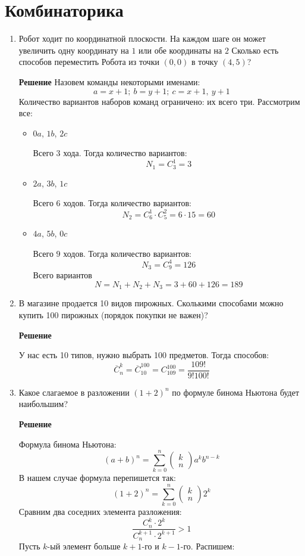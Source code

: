 \documentclass[12pt]{article}
\newcommand{\RomanNumeralCaps}[1]
{\MakeUppercase{\romannumeral #1}}
\begin{document}
	\section{Комбинаторика \RomanNumeralCaps{2}}
	\begin{enumerate}[label={\textbf{\arabic{section}.\arabic*}}]
		\item Робот ходит по координатной плоскости. На каждом шаге он может увеличить одну координату на $1$ или обе координаты на $2$ Сколько есть способов переместить Робота из точки $(0,0)$ в точку $(4,5)$?
		
		\textbf{Решение}
		Назовем команды некоторыми именами:
		$$
		a = x+1;~b = y+1;~c = x+1,~y+1
		$$
		Количество вариантов наборов команд ограничено: их всего три. Рассмотрим все:
		\begin{itemize}
			\item $0a$, $1b$, $2c$
			
			Всего $3$ хода. Тогда количество вариантов:
			$$
			N_1 = C_3^1 = 3
			$$
			\item $2a$, $3b$, $1c$
			
			Всего $6$ ходов. Тогда количество вариантов:
			$$
			N_2 = C_6^1\cdot C_5^2 = 6\cdot15 = 60
			$$
			\item $4a$, $5b$, $0c$
			
			Всего $9$ ходов. Тогда количество вариантов:
			$$
			N_3 = C_9^4 = 126
			$$
			Всего вариантов
			$$
			N = N_1 + N_2 + N_3 = 3 + 60 + 126 = 189
			$$
		\end{itemize}
		
		\item В магазине продается 10 видов пирожных. Сколькими способами можно купить 100 пирожных (порядок покупки не важен)?
		
		\textbf{Решение}
		
		У нас есть 10 типов, нужно выбрать 100 предметов. Тогда способов:
		$$
		\overline{C}_n^k = \overline{C}_{10}^{100} = C_{109}^{100} = \frac{109!}{9!100!}
		$$
		
		\item Какое слагаемое в разложении $(1 + 2)^n$ по формуле бинома Ньютона будет наибольшим?
		
		\textbf{Решение}
		
		Формула бинома Ньютона:
		$$
		(a + b)^n = \sum_{k=0}^{n} 
		\begin{pmatrix}
			k \\
			n
		\end{pmatrix}
		a^kb^{n-k}
		$$
		В нашем случае формула перепишется так:
		$$
		(1 + 2)^n = \sum_{k=0}^{n} 
		\begin{pmatrix}
			k \\
			n
		\end{pmatrix}
		2^k
		$$
		Сравним два соседних элемента разложения:
		$$
		\frac{C_{n}^{k}\cdot2^{k}}{C_{n}^{k+1}\cdot2^{k+1}} > 1
		$$
		Пусть $k$-ый элемент больше $k+1$-го и $k-1$-го. Распишем:
		

\end{enumerate}
\end{document}
